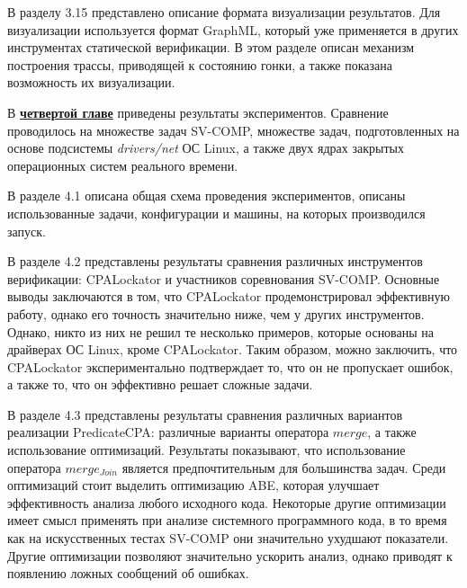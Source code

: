 В разделу 3.15 представлено описание формата визуализации результатов.
Для визуализации используется формат GraphML, который уже применяется в других инструментах статической верификации.
В этом разделе описан механизм построения трассы, приводящей к состоянию гонки, а также показана возможность их визуализации.


В \underline{\textbf{четвертой главе}} приведены результаты экспериментов.
Сравнение проводилось на множестве задач SV-COMP, множестве задач, подготовленных на основе подсистемы \textit{drivers/net} ОС Linux, а также двух ядрах закрытых операционных систем реального времени.

В разделе 4.1 описана общая схема проведения экспериментов, описаны использованные задачи, конфигурации и машины, на которых производился запуск.

В разделе 4.2 представлены результаты сравнения различных инструментов верификации: CPALockator и участников соревнования SV-COMP.
Основные выводы заключаются в том, что CPALockator продемонстрировал эффективную работу, однако его точность значительно ниже, чем у других инструментов.
Однако, никто из них не решил те несколько примеров, которые основаны на драйверах ОС Linux, кроме CPALockator.
Таким образом, можно заключить, что CPALockator экспериментально подтверждает то, что он не пропускает ошибок, а также то, что он эффективно решает сложные задачи.

В разделе 4.3 представлены результаты сравнения различных вариантов реализации PredicateCPA: различные варианты оператора $merge$, а также использование оптимизаций.
Результаты показывают, что использование оператора $merge_{Join}$ является предпочтительным для большинства задач.
Среди оптимизаций стоит выделить оптимизацию ABE, которая улучшает эффективность анализа любого исходного кода.
Некоторые другие оптимизации имеет смысл применять при анализе системного программного кода, в то время как на искусственных тестах SV-COMP они значительно ухудшают показатели.
Другие оптимизации позволяют значительно ускорить анализ, однако приводят к появлению ложных сообщений об ошибках.


